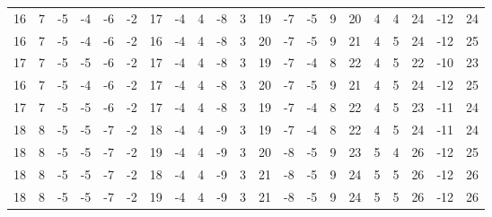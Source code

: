 \begin{center}
\begin{tabular}{*{21}{r}}
16 & 7 & -5 & -4 & -6 & -2 & 17 & -4 & 4 & -8 & 3 & 19 & -7 & -5 & 9 & 20 & 4 & 4 & 24 & -12 & 24 \\
16 & 7 & -5 & -4 & -6 & -2 & 16 & -4 & 4 & -8 & 3 & 20 & -7 & -5 & 9 & 21 & 4 & 5 & 24 & -12 & 25 \\
17 & 7 & -5 & -5 & -6 & -2 & 17 & -4 & 4 & -8 & 3 & 19 & -7 & -4 & 8 & 22 & 4 & 5 & 22 & -10 & 23 \\
16 & 7 & -5 & -4 & -6 & -2 & 17 & -4 & 4 & -8 & 3 & 20 & -7 & -5 & 9 & 21 & 4 & 5 & 24 & -12 & 25 \\
17 & 7 & -5 & -5 & -6 & -2 & 17 & -4 & 4 & -8 & 3 & 19 & -7 & -4 & 8 & 22 & 4 & 5 & 23 & -11 & 24 \\
18 & 8 & -5 & -5 & -7 & -2 & 18 & -4 & 4 & -9 & 3 & 19 & -7 & -4 & 8 & 22 & 4 & 5 & 24 & -11 & 24 \\
18 & 8 & -5 & -5 & -7 & -2 & 19 & -4 & 4 & -9 & 3 & 20 & -8 & -5 & 9 & 23 & 5 & 4 & 26 & -12 & 25 \\
18 & 8 & -5 & -5 & -7 & -2 & 18 & -4 & 4 & -9 & 3 & 21 & -8 & -5 & 9 & 24 & 5 & 5 & 26 & -12 & 26 \\
18 & 8 & -5 & -5 & -7 & -2 & 19 & -4 & 4 & -9 & 3 & 21 & -8 & -5 & 9 & 24 & 5 & 5 & 26 & -12 & 26 \\
\end{tabular}
\end{center}
\endgroup

